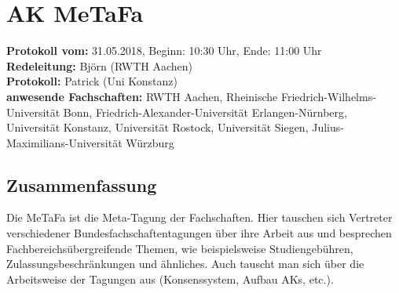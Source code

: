 
\section{AK MeTaFa}

	\textbf{Protokoll vom:} 31.05.2018,
	Beginn: 10:30 Uhr,
	Ende: 11:00 Uhr \\
	\textbf{Redeleitung:} Björn (RWTH Aachen) \\
	\textbf{Protokoll:} Patrick (Uni Konstanz) \\
	\textbf{anwesende Fachschaften:} RWTH Aachen, Rheinische Friedrich-Wilhelms-Universität Bonn, Friedrich-Alexander-Universität Erlangen-Nürnberg, Universität Konstanz, Universität Rostock, Universität Siegen, Julius-Maximilians-Universität Würzburg

	\subsection*{Zusammenfassung}
		Die MeTaFa ist die Meta-Tagung der Fachschaften. Hier tauschen sich Vertreter verschiedener Bundesfachschaftentagungen über ihre Arbeit aus und besprechen Fachbereichsübergreifende Themen, wie beispielsweise Studiengebühren, Zulassungsbeschränkungen und ähnliches. Auch tauscht man sich über die Arbeitsweise der Tagungen aus (Konsenssystem, Aufbau AKs, etc.).
